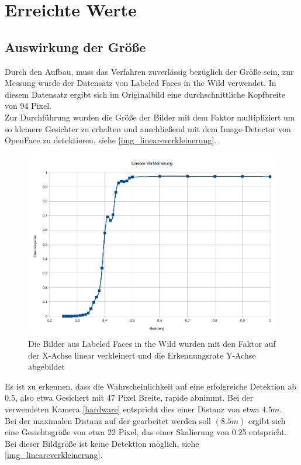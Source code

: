 \section{Erreichte Werte}
\subsection{Auswirkung der Größe}
Durch den Aufbau, muss das Verfahren zuverlässig bezüglich der Größe sein, zur Messung wurde der Datensatz von Labeled Faces in the Wild \cite{database_Face} verwendet. In diesem Datensatz ergibt sich im Originalbild eine durchschnittliche Kopfbreite von 94 Pixel.\\
Zur Durchführung wurden die Größe der Bilder mit dem Faktor multipliziert um so kleinere Gesichter zu erhalten und anschließend mit dem Image-Detector von OpenFace zu detektieren, siehe \autoref{img_lineareverkleinerung}.\\
\begin{figure}
	\centering
	\includegraphics[width=0.5\linewidth]{img/lineare_Verkleinerung}
	\caption{Die Bilder aus Labeled Faces in the Wild \cite{database_Face} wurden mit den Faktor auf der X-Achse linear verkleinert und die Erkennungsrate Y-Achse abgebildet}
	\label{img_lineareverkleinerung}
\end{figure}
Es ist zu erkennen, dass die Wahrscheinlichkeit auf eine erfolgreiche Detektion ab $0.5$, also etwa Gesichert mit 47 Pixel Breite, rapide abnimmt. Bei der verwendeten Kamera \autoref{hardware} entspricht dies einer Distanz von etwa $4.5m$.\\
Bei der maximalen Distanz auf der gearbeitet werden soll $(8.5m)$ ergibt sich eine Gesichtsgröße von etwa 22 Pixel, das einer Skalierung von 0.25 entspricht. Bei dieser Bildgröße ist keine Detektion möglich, siehe \autoref{img_lineareverkleinerung}.
